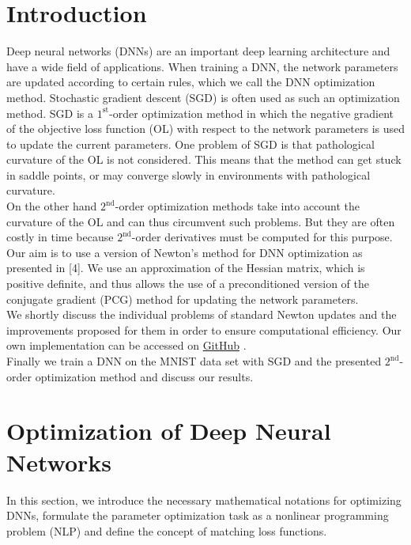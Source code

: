 \documentclass[conference]{IEEEtran}
\begin{document}
	\section{Introduction}
	\noindent
	Deep neural networks (DNNs) are an important deep learning architecture and have a wide field of applications. When training a DNN, the network parameters are updated according to certain rules, which we call the DNN optimization method. Stochastic gradient descent (SGD) is often used as such an optimization method. SGD is a $1^{\text{st}}$-order optimization method in which the negative gradient of the objective loss function (OL) with respect to the network parameters is used to update the current parameters. One problem of SGD is that pathological curvature of the OL is not considered. This means that the method can get stuck in saddle points, or may converge slowly in environments with pathological curvature.\\
	On the other hand $2^{\text{nd}}$-order optimization methods take into account the curvature of the OL and can thus circumvent such problems. But they are often costly in time because $2^{\text{nd}}$-order derivatives must be computed for this purpose.\\
	Our aim is to use a version of Newton's method for DNN optimization as presented in [4]. We use an approximation of the Hessian matrix, which is positive definite, and thus allows the use of a preconditioned version of the conjugate gradient (PCG) method for updating the network parameters.\\ We shortly discuss the individual problems of standard Newton updates and the improvements proposed for them in order to ensure computational efficiency. Our own implementation can be accessed on \href{https://github.com/NiklasBrunn/Hessian_Free_Optimization_of_Deep_Neural_Networks}{GitHub} .\\
	Finally we train a DNN on the MNIST data set with SGD and the presented $2^{\text{nd}}$-order optimization method and discuss our results.
	
	
	\section{Optimization of Deep Neural Networks}
	\noindent
	In this section, we introduce the necessary mathematical notations for optimizing DNNs, formulate the parameter optimization task as a nonlinear programming problem (NLP) and define the concept of matching loss functions.
\end{document}
